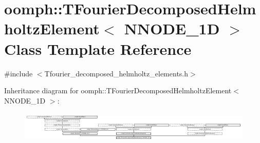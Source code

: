 \hypertarget{classoomph_1_1TFourierDecomposedHelmholtzElement}{}\section{oomph\+:\+:T\+Fourier\+Decomposed\+Helmholtz\+Element$<$ N\+N\+O\+D\+E\+\_\+1D $>$ Class Template Reference}
\label{classoomph_1_1TFourierDecomposedHelmholtzElement}


{\ttfamily \#include $<$Tfourier\+\_\+decomposed\+\_\+helmholtz\+\_\+elements.\+h$>$}

Inheritance diagram for oomph\+:\+:T\+Fourier\+Decomposed\+Helmholtz\+Element$<$ N\+N\+O\+D\+E\+\_\+1D $>$\+:\begin{figure}[H]
\begin{center}
\leavevmode
\includegraphics[height=1.493333cm]{classoomph_1_1TFourierDecomposedHelmholtzElement}
\end{center}
\end{figure}
